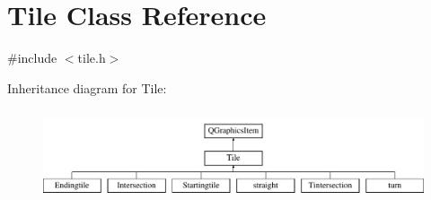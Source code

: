 \hypertarget{class_tile}{}\section{Tile Class Reference}
\label{class_tile}


{\ttfamily \#include $<$tile.\+h$>$}

Inheritance diagram for Tile\+:\begin{figure}[H]
\begin{center}
\leavevmode
\includegraphics[height=2.718446cm]{class_tile}
\end{center}
\end{figure}
